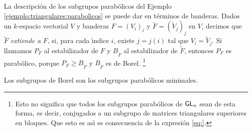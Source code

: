 La descripci\'{o}n de los subgrupos parab\'{o}licos del Ejemplo~%
\ref{ejemplo:triangulares:parabolicos} se puede dar en t\'{e}rminos de
banderas. Dados un $k$-espacio vectorial $V$ y banderas $F=(V_i)_i$ y
$\widetilde F=(\widetilde V_j)_j$ en $V$, decimos que \emph{$\widetilde F$ %
extiende a $F$}, si, para cada \'{\i}ndice $i$, existe $j=j(i)$ tal que
$V_i=\widetilde V_j$. Si llamamos $P_F$ al estabilizador de $F$ y
$B_{\widetilde F}$ al estabilizador de $\widetilde F$, entonces $P_F$ es
parab\'{o}lico, porque $P_F\geq B_{\widetilde F}$ y $B_{\widetilde F}$ es de
Borel.%
\footnote{
	Esto no significa que todos los subgrupos parab\'{o}licos de $\GL[n]$
	sean de esta forma, es decir, conjugados a un subgrupo de matrices
	triangulares superiores en bloques. Que esto es as\'{\i} es
	consecuencia de la expresi\'{o}n \eqref{eq:}.
}

\begin{obsBorel}\label{obs:borel:parabolicos}
	Los subgrupos de Borel son los subgrupos parab\'{o}licos minimales.
\end{obsBorel}
